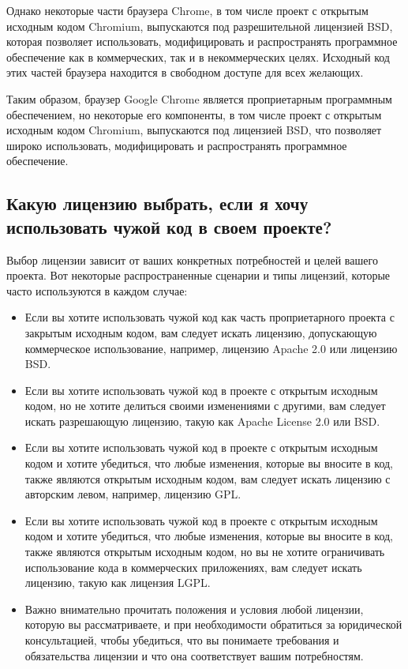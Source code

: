 \documentclass[letterpaper,10pt,russian]{sphinxmanual}
\begin{document}
\sphinxAtStartPar
Однако некоторые части браузера Chrome, в том числе проект с открытым исходным кодом Chromium, выпускаются под разрешительной лицензией BSD, которая позволяет использовать, модифицировать и распространять программное обеспечение как в коммерческих, так и в некоммерческих целях. Исходный код этих частей браузера находится в свободном доступе для всех желающих.

\sphinxAtStartPar
Таким образом, браузер Google Chrome является проприетарным программным обеспечением, но некоторые его компоненты, в том числе проект с открытым исходным кодом Chromium, выпускаются под лицензией BSD, что позволяет широко использовать, модифицировать и распространять программное обеспечение.


\subsection{Какую лицензию выбрать, если я хочу использовать чужой код в своем проекте?}
\label{\detokenize{educational_materials/open_license/content:id4}}
\sphinxAtStartPar
Выбор лицензии зависит от ваших конкретных потребностей и целей вашего проекта. Вот некоторые распространенные сценарии и типы лицензий, которые часто используются в каждом случае:
\begin{itemize}
\item {} 
\sphinxAtStartPar
Если вы хотите использовать чужой код как часть проприетарного проекта с закрытым исходным кодом, вам следует искать лицензию, допускающую коммерческое использование, например, лицензию Apache 2.0 или лицензию BSD.

\item {} 
\sphinxAtStartPar
Если вы хотите использовать чужой код в проекте с открытым исходным кодом, но не хотите делиться своими изменениями с другими, вам следует искать разрешающую лицензию, такую как Apache License 2.0 или BSD.

\item {} 
\sphinxAtStartPar
Если вы хотите использовать чужой код в проекте с открытым исходным кодом и хотите убедиться, что любые изменения, которые вы вносите в код, также являются открытым исходным кодом, вам следует искать лицензию с авторским левом, например, лицензию GPL.

\item {} 
\sphinxAtStartPar
Если вы хотите использовать чужой код в проекте с открытым исходным кодом и хотите убедиться, что любые изменения, которые вы вносите в код, также являются открытым исходным кодом, но вы не хотите ограничивать использование кода в коммерческих приложениях, вам следует искать лицензию, такую как лицензия LGPL.

\item {} 
\sphinxAtStartPar
Важно внимательно прочитать положения и условия любой лицензии, которую вы рассматриваете, и при необходимости обратиться за юридической консультацией, чтобы убедиться, что вы понимаете требования и обязательства лицензии и что она соответствует вашим потребностям.

\end{itemize}
\end{document}
